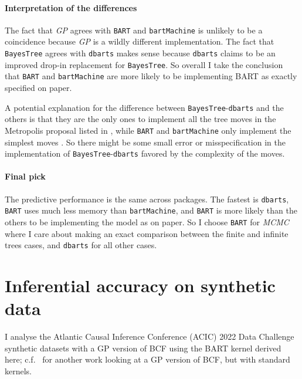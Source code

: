 \documentclass[a4paper]{article}
\theoremstyle{definition}
\begin{document}
    \paragraph{Interpretation of the differences}

    The fact that \emph{GP} agrees with \texttt{BART} and \texttt{bartMachine} is unlikely to be a coincidence because \emph{GP} is a wildly different implementation. The fact that \texttt{BayesTree} agrees with \texttt{dbarts} makes sense because \texttt{dbarts} claims to be an improved drop-in replacement for \texttt{BayesTree}. So overall I take the conclusion that \texttt{BART} and \texttt{bartMachine} are more likely to be implementing BART as exactly specified on paper.
    
    A potential explanation for the difference between \texttt{BayesTree}-\texttt{dbarts} and the others is that they are the only ones to implement all the tree moves in the Metropolis proposal listed in \textcite{chipman1998}, while \texttt{BART} and \texttt{bartMachine} only implement the simplest moves \autocites[][\S A.3, p.~38]{kapelner2016}[][\S C, p.~57]{sparapani2021}. So there might be some small error or misspecification in the implementation of \texttt{BayesTree}-\texttt{dbarts} favored by the complexity of the moves.

    \paragraph{Final pick}

    The predictive performance is the same across packages. The fastest is \texttt{dbarts}, \texttt{BART} uses much less memory than \texttt{bartMachine}, and \texttt{BART} is more likely than the others to be implementing the model as on paper. So I choose \texttt{BART} for \emph{MCMC} where I care about making an exact comparison between the finite and infinite trees cases, and \texttt{dbarts} for all other cases.

    \section{Inferential accuracy on synthetic data}
    \label{sec:simdata}

    I analyse the Atlantic Causal Inference Conference (ACIC) 2022 Data Challenge synthetic datasets with a GP version of BCF using the BART kernel derived here; c.f.\ \textcite{horii2023} for another work looking at a GP version of BCF, but with standard kernels.
\end{document}
